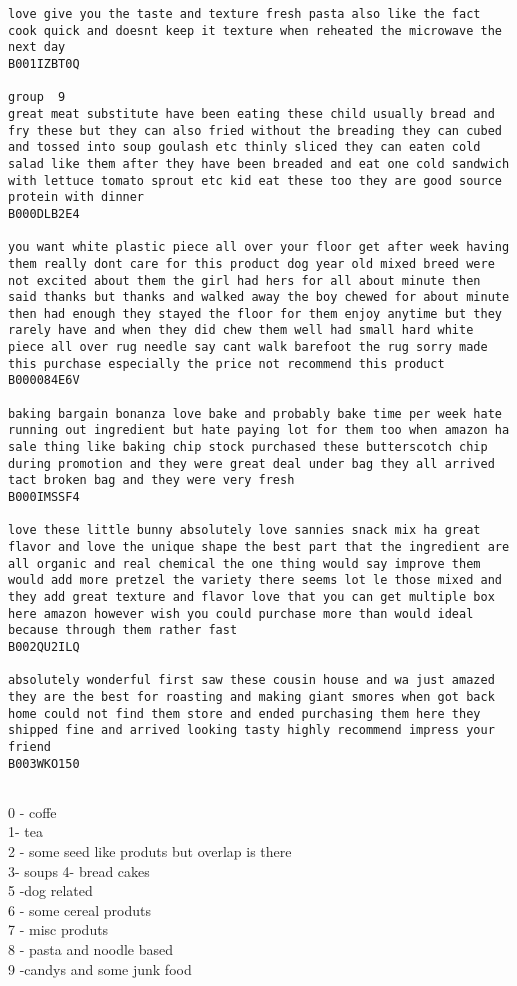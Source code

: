 \documentclass[11pt]{article}
\begin{document}
\begin{Verbatim}[commandchars=\\\{\}]
love give you the taste and texture fresh pasta also like the fact cook quick and doesnt keep it texture when reheated the microwave the next day
B001IZBT0Q

group  9
great meat substitute have been eating these child usually bread and fry these but they can also fried without the breading they can cubed and tossed into soup goulash etc thinly sliced they can eaten cold salad like them after they have been breaded and eat one cold sandwich with lettuce tomato sprout etc kid eat these too they are good source protein with dinner
B000DLB2E4

you want white plastic piece all over your floor get after week having them really dont care for this product dog year old mixed breed were not excited about them the girl had hers for all about minute then said thanks but thanks and walked away the boy chewed for about minute then had enough they stayed the floor for them enjoy anytime but they rarely have and when they did chew them well had small hard white piece all over rug needle say cant walk barefoot the rug sorry made this purchase especially the price not recommend this product
B000084E6V

baking bargain bonanza love bake and probably bake time per week hate running out ingredient but hate paying lot for them too when amazon ha sale thing like baking chip stock purchased these butterscotch chip during promotion and they were great deal under bag they all arrived tact broken bag and they were very fresh
B000IMSSF4

love these little bunny absolutely love sannies snack mix ha great flavor and love the unique shape the best part that the ingredient are all organic and real chemical the one thing would say improve them would add more pretzel the variety there seems lot le those mixed and they add great texture and flavor love that you can get multiple box here amazon however wish you could purchase more than would ideal because through them rather fast
B002QU2ILQ

absolutely wonderful first saw these cousin house and wa just amazed they are the best for roasting and making giant smores when got back home could not find them store and ended purchasing them here they shipped fine and arrived looking tasty highly recommend impress your friend
B003WKO150


    \end{Verbatim}

    0 - coffe\\
1- tea\\
2 - some seed like produts but overlap is there\\
3- soups 4- bread cakes\\
5 -dog related\\
6 - some cereal produts\\
7 - misc produts\\
8 - pasta and noodle based\\
9 -candys and some junk food
\end{document}
